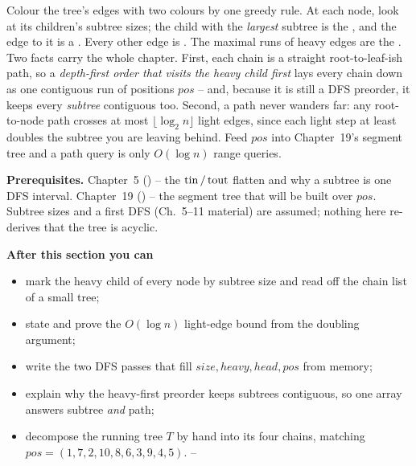 \begin{topicintro}
Colour the tree's edges with two colours by one greedy rule.  At each node, look at its children's subtree sizes; the child with the \emph{largest} subtree is the , and the edge to it is a .  Every other edge is .  The maximal runs of heavy edges are the .  Two facts carry the whole chapter.  First, each chain is a straight root-to-leaf-ish path, so a \emph{depth-first order that visits the heavy child first} lays every chain down as one contiguous run of positions \(\mathit{pos}\) -- and, because it is still a DFS preorder, it keeps every \emph{subtree} contiguous too.  Second, a path never wanders far: any root-to-node path crosses at most \(\lfloor\log_2 n\rfloor\) light edges, since each light step at least doubles the subtree you are leaving behind.  Feed \(\mathit{pos}\) into Chapter~19's segment tree and a path query is only \(O(\log n)\) range queries.

\textbf{Prerequisites.} Chapter~5 () -- the \(\operatorname{tin}/\operatorname{tout}\) flatten and why a subtree is one DFS interval.  Chapter~19 () -- the segment tree that will be built over \(\mathit{pos}\).  Subtree sizes and a first DFS (Ch.~5--11 material) are assumed; nothing here re-derives that the tree is acyclic.

\textbf{After this section you can}
\begin{itemize}[nosep]
  \item mark the heavy child of every node by subtree size and read off the chain list of a small tree; \hfill{}
  \item state and prove the \(O(\log n)\) light-edge bound from the doubling argument; \hfill{}
  \item write the two DFS passes that fill \(\mathit{size},\mathit{heavy},\mathit{head},\mathit{pos}\) from memory; \hfill{}
  \item explain why the heavy-first preorder keeps subtrees contiguous, so one array answers subtree \emph{and} path; \hfill{}
  \item decompose the running tree \(T\) by hand into its four chains, matching \(\mathit{pos}=(1,7,2,10,8,6,3,9,4,5)\). \hfill{}--
\end{itemize}
\end{topicintro}

